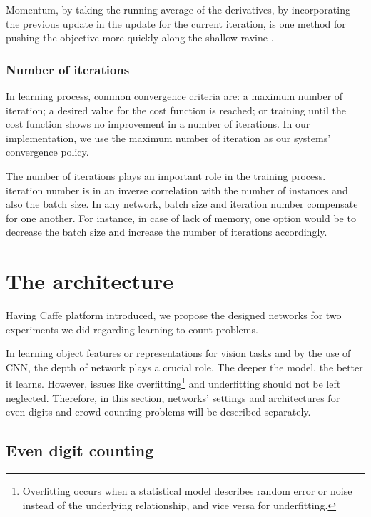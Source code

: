 Momentum, by taking the running average of the derivatives, by incorporating the previous update in the update for the current iteration, is one method for pushing the objective more quickly along the shallow ravine \cite{sgd}. 

\subsubsection{Number of iterations}

In learning process, common convergence criteria are: a maximum number of iteration; a desired value for the cost function is reached; or training until the cost function shows no improvement in a number of iterations. In our implementation, we use the maximum number of iteration as our systems' convergence policy. 
 
The number of iterations plays an important role in the training process. iteration number is in an inverse correlation with the number of instances and also the batch size. In any network, batch size and iteration number compensate for one another. For instance, in case of lack of memory, one option would be to decrease the batch size and increase the number of iterations accordingly.


\section{The architecture}
\label{imparch}
Having Caffe platform introduced, we propose the designed networks for two experiments we did regarding learning to count problems.

In learning object features or representations for vision tasks and by the use of CNN, the depth of network plays a crucial role. The deeper the model, the better it learns. However, issues like overfitting\footnote{Overfitting occurs when a statistical model describes random error or noise instead of the underlying relationship, and vice versa for underfitting. } and underfitting should not be left neglected.   
Therefore, in this section, networks' settings and architectures for even-digits and crowd counting problems will be described separately. 

\subsection{Even digit counting}
\label{subsubsec:digitarch}

